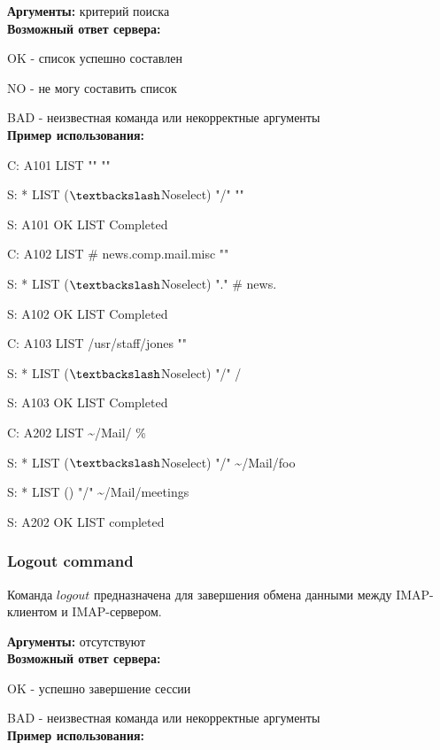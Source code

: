 \documentclass[a4paper,14pt]{extarticle}
\begin{document}
        \textbf{Аргументы:}  критерий поиска \\

        \textbf{Возможный ответ сервера:}

        OK - список успешно составлен

        NO - не могу составить список

        BAD - неизвестная команда или некорректные аргументы \\


        \textbf{Пример использования:}  

        C: A101 LIST "{}"{} "{}"{}
        
        S: * LIST ($\textbackslash$Noselect) "/" "{}"{}

        S: A101 OK LIST Completed

        C: A102 LIST \# news.comp.mail.misc "{}"

        S: * LIST ($\textbackslash$Noselect) "."{} \# news.

        S: A102 OK LIST Completed

        C: A103 LIST /usr/staff/jones "{}"

        S: * LIST ($\textbackslash$Noselect) "/" /

        S: A103 OK LIST Completed

        C: A202 LIST \textasciitilde/Mail/ \%

        S: * LIST ($\textbackslash$Noselect) "/"{} \textasciitilde/Mail/foo

        S: * LIST () "/"{} \textasciitilde/Mail/meetings

        S: A202 OK LIST completed


    \subsubsection{Logout command}

        Команда $logout$ предназначена для завершения обмена данными между IMAP-клиентом и IMAP-сервером.

        \textbf{Аргументы:}  отсутствуют \\

        \textbf{Возможный ответ сервера:}

        OK - успешно завершение сессии

        BAD - неизвестная команда или некорректные аргументы \\


        \textbf{Пример использования:}
\end{document}

